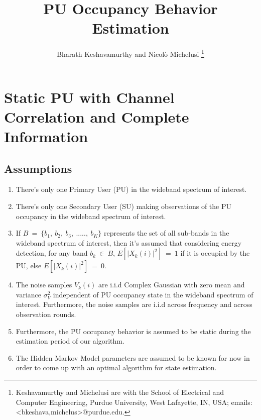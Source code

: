 \documentclass[12pt, draftcls, onecolumn]{IEEEtran}
\begin{document}
 
\title{PU Occupancy Behavior Estimation}
\author{Bharath Keshavamurthy and Nicol\`{o} Michelusi
\thanks{Keshavamurthy and Michelusi are with the School of Electrical and Computer Engineering, Purdue University, West Lafayette, IN, USA; emails:<bkeshava,michelus>@purdue.edu.}}
\maketitle
{}
\maketitle
\section{Static PU with Channel Correlation and Complete Information}
\subsection{Assumptions}
\begin{enumerate}
    \item There's only one Primary User (PU) in the wideband spectrum of interest.
    \item There's only one Secondary User (SU) making observations of the PU occupancy in the wideband spectrum of interest.
    \item If $B\ =\ \{b_1,\ b_2,\ b_3,\ .....,\ b_K\}$ represents the set of all sub-bands in the wideband spectrum of interest, then it's assumed that considering energy detection, for any band $b_k\ \in\ B$, $E[|X_k(i)|^2]\ =\ 1$ if it is occupied by the PU, else $E[|X_k(i)|^2]\ =\ 0$.
    \item The noise samples $V_k(i)$ are i.i.d Complex Gaussian with zero mean and variance $\sigma_V^2$ independent of PU occupancy state in the wideband spectrum of interest. Furthermore, the noise samples are i.i.d across frequency and across observation rounds.
    \item Furthermore, the PU occupancy behavior is assumed to be static during the estimation period of our algorithm.
    \item The Hidden Markov Model parameters are assumed to be known for now in order to come up with an optimal algorithm for state estimation.
\end{enumerate}
\end{document}
